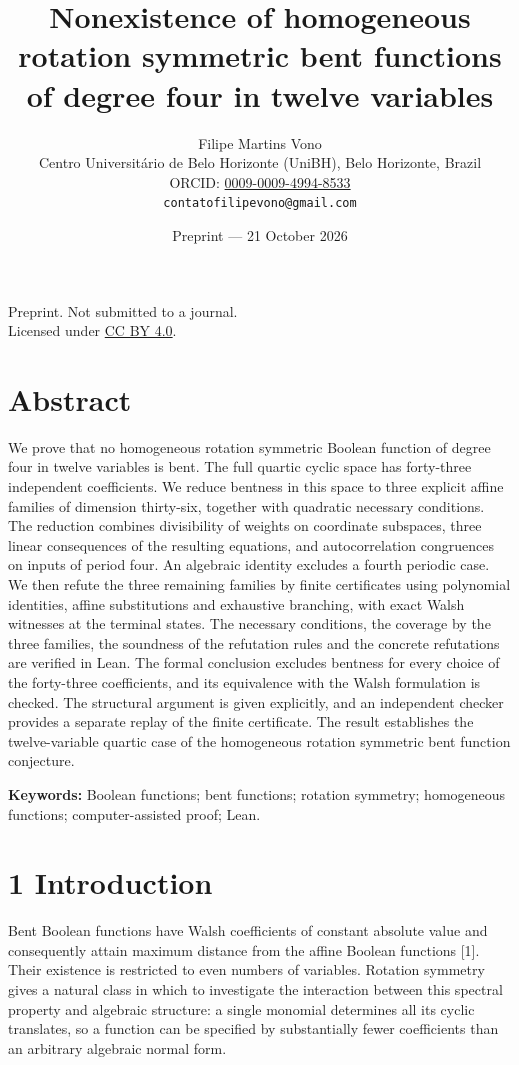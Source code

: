 \documentclass[11pt,a4paper]{article}
\title{Nonexistence of homogeneous rotation symmetric bent functions of degree four in twelve variables}
\author{Filipe Martins Vono\\\small Centro Universit\'ario de Belo Horizonte (UniBH), Belo Horizonte, Brazil\\\small ORCID: \href{https://orcid.org/0009-0009-4994-8533}{0009-0009-4994-8533}\\\small\texttt{contatofilipevono@gmail.com}}
\date{Preprint --- 21 October 2026}
\begin{document}
\maketitle
\begin{center}\small Preprint. Not submitted to a journal.\\Licensed under \href{https://creativecommons.org/licenses/by/4.0/}{CC BY 4.0}.\end{center}
\section*{Abstract}
We prove that no homogeneous rotation symmetric Boolean function of degree four in twelve variables is bent. The full quartic cyclic space has forty-three independent coefficients. We reduce bentness in this space to three explicit affine families of dimension thirty-six, together with quadratic necessary conditions. The reduction combines divisibility of weights on coordinate subspaces, three linear consequences of the resulting equations, and autocorrelation congruences on inputs of period four. An algebraic identity excludes a fourth periodic case. We then refute the three remaining families by finite certificates using polynomial identities, affine substitutions and exhaustive branching, with exact Walsh witnesses at the terminal states. The necessary conditions, the coverage by the three families, the soundness of the refutation rules and the concrete refutations are verified in Lean. The formal conclusion excludes bentness for every choice of the forty-three coefficients, and its equivalence with the Walsh formulation is checked. The structural argument is given explicitly, and an independent checker provides a separate replay of the finite certificate. The result establishes the twelve-variable quartic case of the homogeneous rotation symmetric bent function conjecture.

\textbf{Keywords:} Boolean functions; bent functions; rotation symmetry; homogeneous functions; computer-assisted proof; Lean.
\section*{1 Introduction}

Bent Boolean functions have Walsh coefficients of constant absolute value and consequently attain maximum distance from the affine Boolean functions [1]. Their existence is restricted to even numbers of variables. Rotation symmetry gives a natural class in which to investigate the interaction between this spectral property and algebraic structure: a single monomial determines all its cyclic translates, so a function can be specified by substantially fewer coefficients than an arbitrary algebraic normal form.
\end{document}
